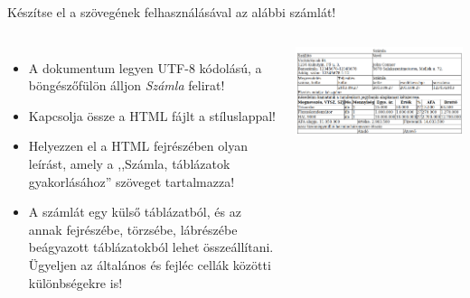 \begin{frame}
  Készítse el a  szövegének felhasználásával az alábbi számlát!
  \begin{columns}[c]
      \begin{itemize}
        \small
        \item A dokumentum legyen UTF-8 kódolású, a böngészőfülön álljon \emph{Számla} felirat!
        \item Kapcsolja össze a HTML fájlt a  stíluslappal!
        \item Helyezzen el a HTML fejrészében olyan leírást, amely a ,,Számla, táblázatok gyakorlásához'' szöveget tartalmazza!
        \item A számlát egy külső táblázatból, és az annak fejrészébe, törzsébe, lábrészébe beágyazott táblázatokból lehet összeállítani. Ügyeljen az általános és fejléc cellák közötti különbségekre is!
      \end{itemize}
      \begin{exampleblock}{}
        \includegraphics[width=\textwidth]{szamla.png}
      \end{exampleblock}
  \end{columns}
\end{frame}

